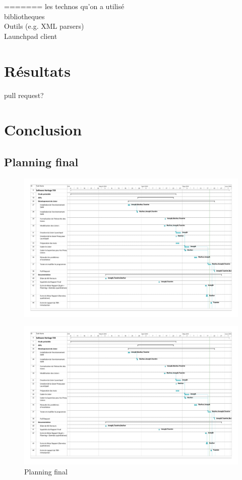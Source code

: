 \documentclass[12pt,a4paper]{report}
\theoremstyle{definition}
\begin{document}
=======
les technos qu'on a utilisé\\
bibliotheques\\
Outils (e.g. XML parsers)\\
Launchpad client

\chapter{Résultats}
pull request?

\chapter{Conclusion}
	\section{Planning final}
	\begin{figure}[!ht]
	\hspace*{-3cm}
	\includegraphics[scale=0.45]{pdfs/planning_final_summary.pdf}
	\end{figure}
	\begin{figure}[!ht]
	\hspace*{-3cm}
	\includegraphics[scale=0.45,page=2]{pdfs/planning_final_summary.pdf}
	\caption{Planning final}
	\end{figure}
\end{document}
